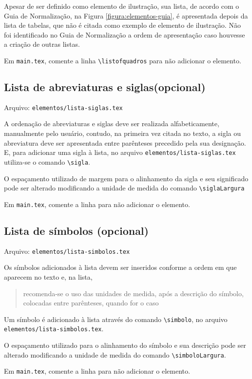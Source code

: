     Apesar de ser definido como elemento de ilustração, sua lista, de acordo com o Guia de Normalização, na Figura \ref{figura:elementos-guia}, é apresentada depois da lista de tabelas, que não é citada como exemplo de elemento de ilustração. Não foi identificado no Guia de Normalização a ordem de apresentação caso houvesse a criação de outras listas.

    Em \texttt{main.tex}, comente a linha \verb|\listofquadros| para não adicionar o elemento.

\subsection{Lista de abreviaturas e siglas(opcional)}
    Arquivo: \texttt{elementos/lista-siglas.tex}

    A ordenação de abreviaturas e siglas deve ser realizada alfabeticamente, manualmente pelo usuário, contudo, na primeira vez citada no texto, a sigla ou abreviatura deve ser apresentada entre parênteses precedido pela sua designação. E, para adicionar uma sigla à lista, no arquivo \texttt{elementos/lista-siglas.tex} utiliza-se o comando \verb|\sigla|.

    O espaçamento utilizado de margem para o alinhamento da sigla e seu significado pode ser alterado modificando a unidade de medida do comando \verb|\siglaLargura|

    Em \texttt{main.tex}, comente a linha \verb|| para não adicionar o elemento.

\subsection{Lista de símbolos (opcional)}
    Arquivo: \texttt{elementos/lista-simbolos.tex}

    Os símbolos adicionados à lista devem ser inseridos conforme a ordem em que aparecem no texto e, na lista, \blockcquote[p. 32]{livro:iffar-guia-normalizacao-2022}{recomenda-se o uso das unidades de medida, após a descrição do símbolo, colocadas entre parênteses, quando for o caso}. Um símbolo é adicionado à lista através do comando \verb|\simbolo|, no arquivo \texttt{elementos/lista-simbolos.tex}.

    O espaçamento utilizado para o alinhamento do símbolo e sua descrição pode ser alterado modificando a unidade de medida do comando \verb|\simboloLargura|.

    Em \texttt{main.tex}, comente a linha \verb|| para não adicionar o elemento.
    
